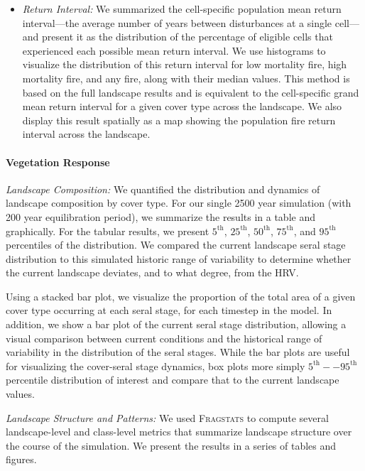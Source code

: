 \begin{itemize}
	\item \emph{Return Interval:} We summarized the cell-specific population mean return interval---the average number of years between disturbances at a single cell---and present it as the distribution of the percentage of eligible cells that experienced each possible mean return interval. We use histograms to visualize the distribution of this return interval for low mortality fire, high mortality fire, and any fire, along with their median values. This method is based on the full landscape results and is equivalent to the cell-specific grand mean return interval for a given cover type across the landscape. We also display this result spatially as a map showing the population fire return interval across the landscape.
\end{itemize}

\paragraph{Vegetation Response} 

\par \emph{Landscape Composition:} We quantified the distribution and dynamics of landscape composition by cover type. For our single 2500 year simulation (with 200 year equilibration period), we summarize the results in a table and graphically. For the tabular results, we present $5^{\text{th}}$, $25^{\text{th}}$, $50^{\text{th}}$, $75^{\text{th}}$, and $95^{\text{th}}$ percentiles of the distribution. We compared the current landscape seral stage distribution to this simulated historic range of variability to determine whether the current landscape deviates, and to what degree, from the HRV. 

Using a stacked bar plot, we visualize the proportion of the total area of a given cover type occurring at each seral stage, for each timestep in the model. In addition, we show a bar plot of the current seral stage distribution, allowing a visual comparison between current conditions and the historical range of variability in the distribution of the seral stages. While the bar plots are useful for visualizing the cover-seral stage dynamics, box plots more simply $5^{\text{th}}--95^{\text{th}}$ percentile distribution of interest and compare that to the current landscape values.






\emph{Landscape Structure and Patterns:} We used \textsc{Fragstats} \citep{Fragstats2012} to compute several landscape-level and class-level metrics that summarize landscape structure over the course of the simulation. We present the results in a series of tables and figures. 


